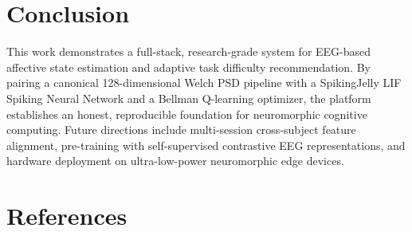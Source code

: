 \documentclass[conference]{IEEEtran}
\begin{document}
\section{Conclusion}
\label{conclusion}
This work demonstrates a full-stack, research-grade system for EEG-based affective state estimation and adaptive task difficulty recommendation. By pairing a canonical 128-dimensional Welch PSD pipeline with a SpikingJelly LIF Spiking Neural Network and a Bellman Q-learning optimizer, the platform establishes an honest, reproducible foundation for neuromorphic cognitive computing. Future directions include multi-session cross-subject feature alignment, pre-training with self-supervised contrastive EEG representations, and hardware deployment on ultra-low-power neuromorphic edge devices.


\section*{References}


\end{document}
